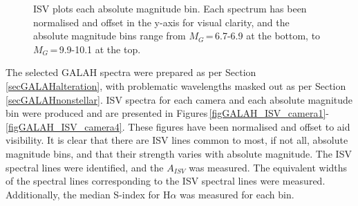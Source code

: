 \begin{figure}
    \caption{ISV plots each absolute magnitude bin. Each spectrum has been normalised and offset in the y-axis for visual clarity, and the absolute magnitude bins range from $M_G$\,=\,6.7-6.9 at the bottom, to $M_G$\,=\,9.9-10.1 at the top.}
\end{figure}

The selected GALAH spectra were prepared as per Section\,\ref{secGALAHalteration}, with problematic wavelengths masked out as per Section\,\ref{secGALAHnonstellar}. ISV spectra for each camera and each absolute magnitude bin were produced and are presented in Figures\,\ref{figGALAH_ISV_camera1}-\ref{figGALAH_ISV_camera4}. These figures have been normalised and offset to aid visibility. It is clear that there are ISV lines common to most, if not all, absolute magnitude bins, and that their strength varies with absolute magnitude. The ISV spectral lines were identified, and the $A_{ISV}$ was measured. The equivalent widths of the spectral lines corresponding to the ISV spectral lines were measured. Additionally, the median S-index for H$\alpha$ was measured for each bin.\\
 
